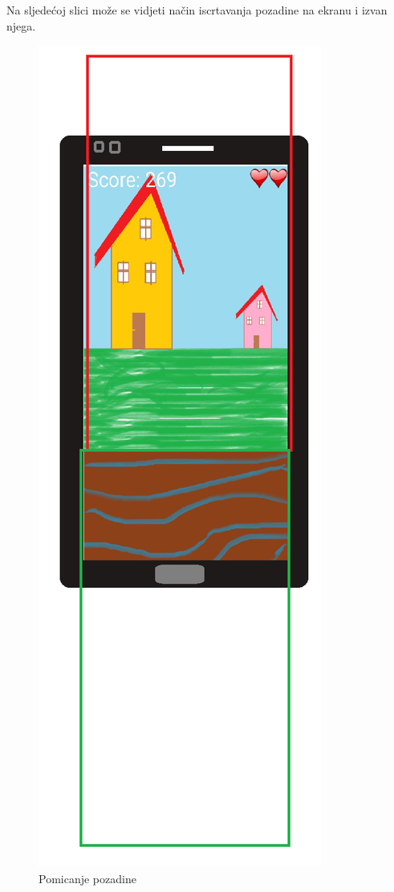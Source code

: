 \documentclass[times, utf8, zavrsni]{fer}
\begin{document}
	Na sljedećoj slici može se vidjeti način iscrtavanja pozadine na ekranu i izvan njega.
	
	\begin{figure}[H]
			\includegraphics[scale=0.6]{"slike/background.png"} 
			\centering
			\caption{Pomicanje pozadine}
			\label{fig:pomicanjepozadine}
	\end{figure}
		
\end{document}
